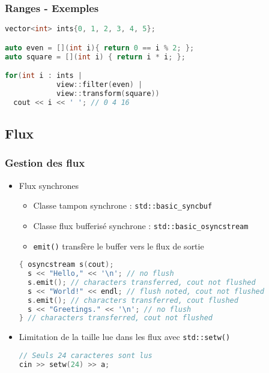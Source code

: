 \documentclass[C++.tex]{subfiles}
\begin{document}
\begin{frame}[fragile]
	\frametitle{Ranges - Exemples}
	\begin{lstlisting}[language=C++]
vector<int> ints{0, 1, 2, 3, 4, 5};

auto even = [](int i){ return 0 == i % 2; };
auto square = [](int i) { return i * i; };

for(int i : ints | 
            view::filter(even) | 
            view::transform(square))
  cout << i << ' '; // 0 4 16\end{lstlisting}
\end{frame}

\subsection*{Flux}
\begin{frame}[fragile]
	\frametitle{Gestion des flux}
	\begin{itemize}
		\item Flux synchrones
		\begin{itemize}
			\item Classe tampon synchrone : \lstinline|std::basic_syncbuf|
			\item Classe flux bufferisé synchrone : \lstinline|std::basic_osyncstream|
			\item \lstinline|emit()| transfère le buffer vers le flux de sortie
		\end{itemize}


		\begin{lstlisting}[language=C++]
{ osyncstream s(cout);
  s << "Hello," << '\n'; // no flush
  s.emit(); // characters transferred, cout not flushed
  s << "World!" << endl; // flush noted, cout not flushed
  s.emit(); // characters transferred, cout flushed
  s << "Greetings." << '\n'; // no flush
} // characters transferred, cout not flushed\end{lstlisting}

		\item Limitation de la taille lue dans les flux avec \lstinline|std::setw()|

		\begin{lstlisting}[language=C++]
// Seuls 24 caracteres sont lus
cin >> setw(24) >> a;\end{lstlisting}
	\end{itemize}
\end{frame}
\end{document}
